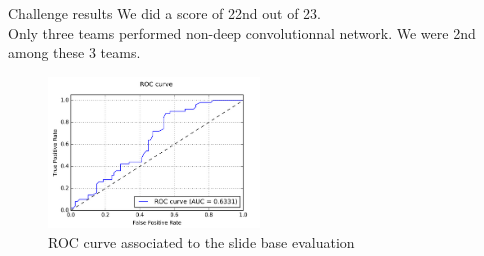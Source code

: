 \documentclass{beamer}
\begin{document}
\begin{frame}[noframenumbering]{Challenge results}
We did a score of 22nd out of 23. \\
Only three teams performed non-deep convolutionnal network. We were 2nd among these 3 teams.
\begin{figure}[!ht]
\centering
\includegraphics[width=0.5\textwidth]{ROC.png}
\caption{ROC curve associated to the slide base evaluation}
\label{Eval: ROC}
\end{figure}
\end{frame}
\end{document}
